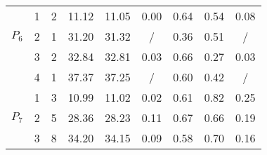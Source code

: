 \documentclass[11p]{article}
\begin{document}
\begin{tabular}{ccc|c|c|c||c|c|c||}
\multicolumn{1}{|c|}{\multirow{3}{*}{$P_6$}} & \multicolumn{1}{c|}{1} & 2
 & \multicolumn{1}{||c|}{11.12} & 11.05 & 0.00 & 0.64 & 0.54 & 0.08 \\ \cline{2-9} 
\multicolumn{1}{|c|}{} & \multicolumn{1}{c|}{2} & 1
 & \multicolumn{1}{||c|}{31.20} & 31.32 & / & 0.36 & 0.51 & / \\ \cline{2-9} 
\multicolumn{1}{|c|}{} & \multicolumn{1}{c|}{3} & 2
 & \multicolumn{1}{||c|}{32.84} & 32.81 & 0.03 & 0.66 & 0.27 & 0.03 \\ \cline{2-9} 
\multicolumn{1}{|c|}{} & \multicolumn{1}{c|}{4} & 1
 & \multicolumn{1}{||c|}{37.37} & 37.25 & / & 0.60 & 0.42 & / \\ \hline \hline

\multicolumn{1}{|c|}{\multirow{3}{*}{$P_7$}} & \multicolumn{1}{c|}{1} & 3
 & \multicolumn{1}{||c|}{10.99} & 11.02 & 0.02 & 0.61 & 0.82 & 0.25 \\ \cline{2-9} 
\multicolumn{1}{|c|}{} & \multicolumn{1}{c|}{2} & 5
 & \multicolumn{1}{||c|}{28.36} & 28.23 & 0.11 & 0.67 & 0.66 & 0.19 \\ \cline{2-9} 
\multicolumn{1}{|c|}{} & \multicolumn{1}{c|}{3} & 8
 & \multicolumn{1}{||c|}{34.20} & 34.15 & 0.09 & 0.58 & 0.70 & 0.16 \\ \hline
 
\end{tabular}
\end{document}
